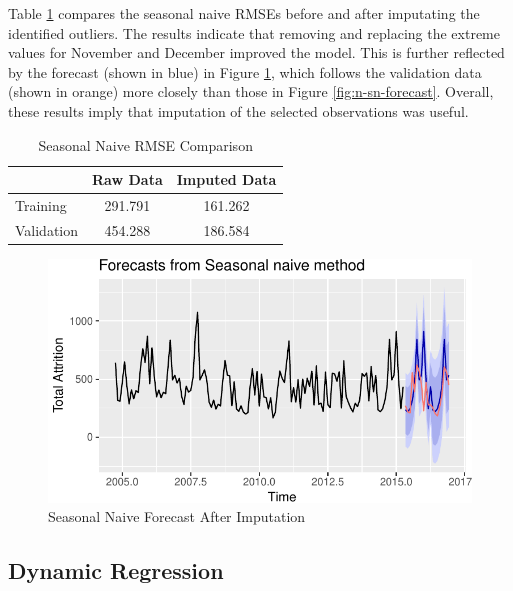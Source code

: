 \documentclass[12pt,letterpaper,toc=flat,oneside]{report}
\theoremstyle{definition}
\theoremstyle{definition}
\theoremstyle{definition}
\theoremstyle{remark}
\begin{document}
Table \ref{tab:season-rmse-compare} compares the seasonal naive RMSEs
before and after imputating the identified outliers. The results
indicate that removing and replacing the extreme values for November and
December improved the model. This is further reflected by the forecast
(shown in blue) in Figure \ref{fig:sn-forecast-2}, which follows the
validation data (shown in orange) more closely than those in Figure
\ref{fig:n-sn-forecast}. Overall, these results imply that imputation of
the selected observations was useful.

\begin{table}[!h]

\caption{\label{tab:season-rmse-compare}Seasonal Naive RMSE Comparison}
\centering
\begin{tabular}[t]{lcc}
\toprule
\bfseries{ } & \bfseries{Raw Data} & \bfseries{Imputed Data}\\
\midrule
Training & 291.791 & 161.262\\
Validation & 454.288 & 186.584\\
\bottomrule
\end{tabular}
\end{table}

\begin{figure}[H]

{\centering \includegraphics{elliott-econometric-personnel-retention-18_files/figure-latex/sn-forecast-2-1} 

}

\caption{Seasonal Naive Forecast After Imputation}\label{fig:sn-forecast-2}
\end{figure}

\hypertarget{dynamic-regression}{%
\subsection{Dynamic Regression}\label{dynamic-regression}}
\end{document}
